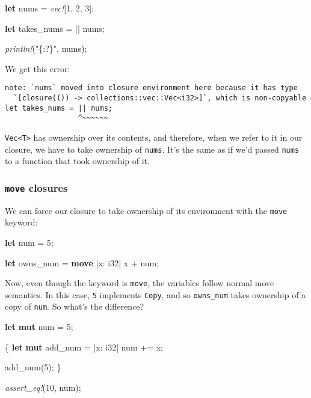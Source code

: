 \documentclass[a4paper,]{book}
\newenvironment{Shaded}{\begin{snugshade}}{\end{snugshade}}
\newcommand{\KeywordTok}[1]{\textcolor[rgb]{0.13,0.29,0.53}{\textbf{{#1}}}}
\newcommand{\DataTypeTok}[1]{\textcolor[rgb]{0.13,0.29,0.53}{{#1}}}
\newcommand{\DecValTok}[1]{\textcolor[rgb]{0.00,0.00,0.81}{{#1}}}
\newcommand{\StringTok}[1]{\textcolor[rgb]{0.31,0.60,0.02}{{#1}}}
\newcommand{\PreprocessorTok}[1]{\textcolor[rgb]{0.56,0.35,0.01}{\textit{{#1}}}}
\newcommand{\NormalTok}[1]{{#1}}
\begin{document}
\begin{Shaded}
\begin{Highlighting}[]
\KeywordTok{let} \NormalTok{nums = }\PreprocessorTok{vec!}\NormalTok{[}\DecValTok{1}\NormalTok{, }\DecValTok{2}\NormalTok{, }\DecValTok{3}\NormalTok{];}

\KeywordTok{let} \NormalTok{takes_nums = || nums;}

\PreprocessorTok{println!}\NormalTok{(}\StringTok{"\{:?\}"}\NormalTok{, nums);}
\end{Highlighting}
\end{Shaded}

We get this error:

\begin{verbatim}
note: `nums` moved into closure environment here because it has type
  `[closure(()) -> collections::vec::Vec<i32>]`, which is non-copyable
let takes_nums = || nums;
                 ^~~~~~~
\end{verbatim}

\texttt{Vec\textless{}T\textgreater{}} has ownership over its contents,
and therefore, when we refer to it in our closure, we have to take
ownership of \texttt{nums}. It's the same as if we'd passed
\texttt{nums} to a function that took ownership of it.

\subsubsection{\texorpdfstring{\texttt{move}
closures}{move closures}}\label{move-closures}

We can force our closure to take ownership of its environment with the
\texttt{move} keyword:

\begin{Shaded}
\begin{Highlighting}[]
\KeywordTok{let} \NormalTok{num = }\DecValTok{5}\NormalTok{;}

\KeywordTok{let} \NormalTok{owns_num = }\KeywordTok{move} \NormalTok{|x: }\DataTypeTok{i32}\NormalTok{| x + num;}
\end{Highlighting}
\end{Shaded}

Now, even though the keyword is \texttt{move}, the variables follow
normal move semantics. In this case, \texttt{5} implements
\texttt{Copy}, and so \texttt{owns\_num} takes ownership of a copy of
\texttt{num}. So what's the difference?

\begin{Shaded}
\begin{Highlighting}[]
\KeywordTok{let} \KeywordTok{mut} \NormalTok{num = }\DecValTok{5}\NormalTok{;}

\NormalTok{\{}
    \KeywordTok{let} \KeywordTok{mut} \NormalTok{add_num = |x: }\DataTypeTok{i32}\NormalTok{| num += x;}

    \NormalTok{add_num(}\DecValTok{5}\NormalTok{);}
\NormalTok{\}}

\PreprocessorTok{assert_eq!}\NormalTok{(}\DecValTok{10}\NormalTok{, num);}
\end{Highlighting}
\end{Shaded}
\end{document}
